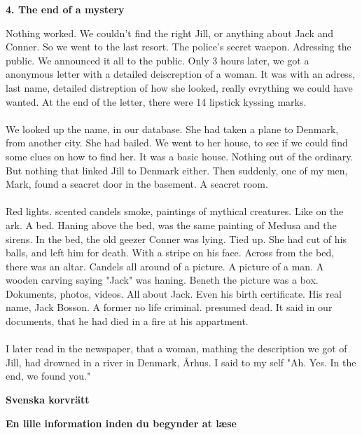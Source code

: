 \documentclass[]{article}
\begin{document}
\begin{center}
	\large\textbf{4. The end of a mystery}
\end{center}

Nothing worked. We couldn't find the right Jill, or anything about Jack and Conner. So we went to the last resort. The police's secret waepon. Adressing the public. We announced it all to the public. Only 3 hours later, we got a anonymous letter with a detailed deiscreption of a woman. It was with an adress, last name, detailed distreption of how she looked, really evrything we could have wanted. At the end of the letter, there were 14 lipstick kyssing marks.
\\ \\
We looked up the name, in our database. She had taken a plane to Denmark, from another city. She had bailed. We went to her house, to see if we could find some clues on how to find her. It was a basic house. Nothing out of the ordinary. But nothing that linked Jill to Denmark either. Then suddenly, one of my men, Mark, found a seacret door in the basement. A seacret room. 
\\ \\
Red lights. scented candels smoke, paintings of mythical creatures. Like on the ark. A bed. Haning above the bed, was the same painting of Medusa and the sirens. In the bed, the old geezer Conner was lying. Tied up. She had cut of his balls, and left him for death. With a stripe on his face. Across from the bed, there was an altar. Candels all around of a picture. A picture of a man. A wooden carving saying "Jack" was haning. Beneth the picture was a box. Dokuments, photos, videos. All about Jack. Even his birth certificate. His real name, Jack Bosson. A former no life criminal. presumed dead. It said in our documents, that he had died in a fire at his appartment.  
\\ \\
I later read in the newspaper, that a woman, mathing the description we got of Jill, had drowned in a river in Denmark, Århus. I said to my self "Ah. Yes. In the end, we found you."

\newpage

\begin{center}
	\Large\textbf{Svenska korvrätt}
\end{center}

\begin{center}
	\large\textbf{En lille information inden du begynder at læse}
\end{center}
\end{document}
